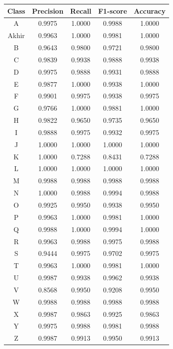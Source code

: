 \begin{center}
	\begin{table}[!hbt]
	\centering
	\label{tbl:ModelCNN2CONFUSIONMATRIX}
	\begin{tabular}{|c|c|c|c|c|}
	\hline
	Class & Precision & Recall & F1-score & Accuracy \\
	\hline
	A & 0.9975 & 1.0000 & 0.9988 & 1.0000 \\
	Akhir & 0.9963 & 1.0000 & 0.9981 & 1.0000 \\
	B & 0.9643 & 0.9800 & 0.9721 & 0.9800 \\
	C & 0.9839 & 0.9938 & 0.9888 & 0.9938 \\
	D & 0.9975 & 0.9888 & 0.9931 & 0.9888 \\
	E & 0.9877 & 1.0000 & 0.9938 & 1.0000 \\
	F & 0.9901 & 0.9975 & 0.9938 & 0.9975 \\
	G & 0.9766 & 1.0000 & 0.9881 & 1.0000 \\
	H & 0.9822 & 0.9650 & 0.9735 & 0.9650 \\
	I & 0.9888 & 0.9975 & 0.9932 & 0.9975 \\
	J & 1.0000 & 1.0000 & 1.0000 & 1.0000 \\
	K & 1.0000 & 0.7288 & 0.8431 & 0.7288 \\
	L & 1.0000 & 1.0000 & 1.0000 & 1.0000 \\
	M & 0.9988 & 0.9988 & 0.9988 & 0.9988 \\
	N & 1.0000 & 0.9988 & 0.9994 & 0.9988 \\
	O & 0.9925 & 0.9950 & 0.9938 & 0.9950 \\
	P & 0.9963 & 1.0000 & 0.9981 & 1.0000 \\
	Q & 0.9988 & 1.0000 & 0.9994 & 1.0000 \\
	R & 0.9963 & 0.9988 & 0.9975 & 0.9988 \\
	S & 0.9444 & 0.9975 & 0.9702 & 0.9975 \\
	T & 0.9963 & 1.0000 & 0.9981 & 1.0000 \\
	U & 0.9987 & 0.9938 & 0.9962 & 0.9938 \\
	V & 0.8568 & 0.9950 & 0.9208 & 0.9950 \\
	W & 0.9988 & 0.9988 & 0.9988 & 0.9988 \\
	X & 0.9987 & 0.9863 & 0.9925 & 0.9863 \\
	Y & 0.9975 & 0.9988 & 0.9981 & 0.9988 \\
	Z & 0.9987 & 0.9913 & 0.9950 & 0.9913 \\
	\hline
	\end{tabular}
	\end{table}
\end{center}

